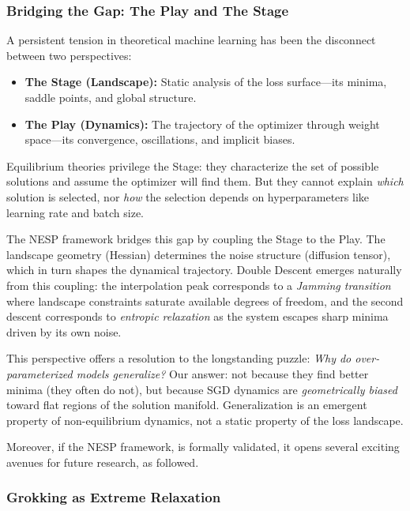 \subsubsection{Bridging the Gap: The Play and The Stage}

A persistent tension in theoretical machine learning has been the disconnect between two perspectives:
\begin{itemize}[topsep=1pt,itemsep=1pt]
    \item \textbf{The Stage (Landscape):} Static analysis of the loss surface---its minima, saddle points, and global structure.
    \item \textbf{The Play (Dynamics):} The trajectory of the optimizer through weight space---its convergence, oscillations, and implicit biases.
\end{itemize}

Equilibrium theories privilege the Stage: they characterize the set of possible solutions and assume the optimizer will find them. But they cannot explain \textit{which} solution is selected, nor \textit{how} the selection depends on hyperparameters like learning rate and batch size.

The NESP framework bridges this gap by coupling the Stage to the Play. The landscape geometry (Hessian) determines the noise structure (diffusion tensor), which in turn shapes the dynamical trajectory. Double Descent emerges naturally from this coupling: the interpolation peak corresponds to a \textit{Jamming transition} where landscape constraints saturate available degrees of freedom, and the second descent corresponds to \textit{entropic relaxation} as the system escapes sharp minima driven by its own noise.

This perspective offers a resolution to the longstanding puzzle: \textit{Why do over-parameterized models generalize?} Our answer: not because they find better minima (they often do not), but because SGD dynamics are \textit{geometrically biased} toward flat regions of the solution manifold. Generalization is an emergent property of non-equilibrium dynamics, not a static property of the loss landscape.

Moreover, if the NESP framework, is formally validated, it opens several exciting avenues for future research, as followed. 

\subsubsection{Grokking as Extreme Relaxation}

